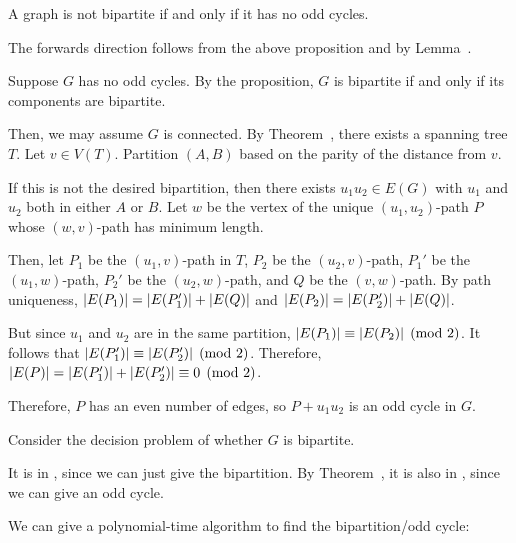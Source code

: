 \begin{theorem}[5.3.2]\label{thm:oddbi}
  A graph is not bipartite if and only if it has no odd cycles.
\end{theorem}
\begin{prf}
  The forwards direction follows from the above proposition
  and by Lemma~.

  Suppose $G$ has no odd cycles.
  By the proposition, $G$ is bipartite if and only if its components are bipartite.

  Then, we may assume $G$ is connected.
  By Theorem~, there exists a spanning tree $T$.
  Let $v \in V(T)$.
  Partition $(A,B)$ based on the parity of the distance from $v$.

  If this is not the desired bipartition, then there exists $u_1u_2 \in E(G)$
  with $u_1$ and $u_2$ both in either $A$ or $B$.
  Let $w$ be the vertex of the unique $(u_1, u_2)$-path $P$
  whose $(w,v)$-path has minimum length.

  Then, let $P_1$ be the $(u_1,v)$-path in $T$, $P_2$ be the $(u_2,v)$-path,
  $P_1'$ be the $(u_1,w)$-path, $P_2'$ be the $(u_2,w)$-path,
  and $Q$ be the $(v,w)$-path.
  By path uniqueness, $\abs{E(P_1)} = \abs{E(P_1')} + \abs{E(Q)}$
  and $\abs{E(P_2)} = \abs{E(P_2')} + \abs{E(Q)}$.

  But since $u_1$ and $u_2$ are in the same partition,
  $\abs{E(P_1)} \equiv \abs{E(P_2)} \pmod{2}$.
  It follows that $\abs{E(P_1')} \equiv \abs{E(P_2')} \pmod{2}$.
  Therefore, $\abs{E(P)} = \abs{E(P_1')} + \abs{E(P_2')} \equiv 0 \pmod{2}$.

  Therefore, $P$ has an even number of edges, so $P + u_1u_2$ is an odd cycle in $G$.
\end{prf}

Consider the decision problem of whether $G$ is bipartite.

It is in \NP, since we can just give the bipartition.
By Theorem~, it is also in \coNP, since we can give an odd cycle.

We can give a polynomial-time algorithm to find the bipartition/odd cycle:

